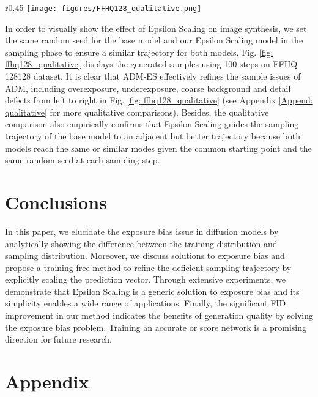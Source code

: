 \documentclass{article} \usepackage{iclr2024_conference,times}
\begin{document}
\begin{wrapfigure}{r}{0.45\textwidth}
\vskip -0.2in
  \texttt{[image: figures/FFHQ128\_qualitative.png]}
  \captionsetup{skip=1pt}
  \caption{Qualitative comparison between ADM (first row) and ADM-ES (second row).}
\label{fig: ffhq128_qualitative}
\vskip -0.1in
\end{wrapfigure}

In order to visually show the effect of Epsilon Scaling on image synthesis, we set the same random seed for the base model and our Epsilon Scaling model in the sampling phase to ensure a similar trajectory for both models. Fig. \ref{fig: ffhq128_qualitative} displays the generated samples using 100 steps on FFHQ 128128 dataset. It is clear that ADM-ES effectively refines the sample issues of ADM, including overexposure, underexposure, coarse background and detail defects from left to right in Fig. \ref{fig: ffhq128_qualitative} (see Appendix \ref{Append: qualitative} for more qualitative comparisons). Besides, the qualitative comparison also empirically confirms that Epsilon Scaling guides the sampling trajectory of the base model to an adjacent but better trajectory because both models reach the same or similar modes given the common starting point  and the same random seed at each sampling step.


\section{Conclusions}
In this paper, we elucidate the exposure bias issue in diffusion models by analytically showing the difference between the training distribution and sampling distribution. Moreover, we discuss solutions to exposure bias and propose a training-free method to refine the deficient sampling trajectory by explicitly scaling the prediction vector. Through extensive experiments, we demonstrate that Epsilon Scaling is a generic solution to exposure bias and its simplicity enables a wide range of applications. Finally, the significant FID improvement in our method indicates the benefits of generation quality by solving the exposure bias problem. Training an accurate  or score network is a promising direction for future research.










\newpage
\appendix
\section{Appendix}
\end{document}
